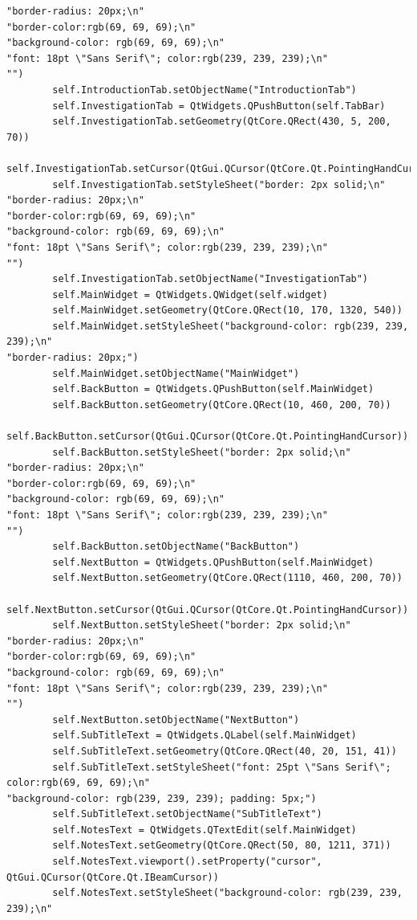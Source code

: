 \documentclass[12pt]{article}
\begin{document}
\begin{lstlisting}
"border-radius: 20px;\n"
"border-color:rgb(69, 69, 69);\n"
"background-color: rgb(69, 69, 69);\n"
"font: 18pt \"Sans Serif\"; color:rgb(239, 239, 239);\n"
"")
        self.IntroductionTab.setObjectName("IntroductionTab")
        self.InvestigationTab = QtWidgets.QPushButton(self.TabBar)
        self.InvestigationTab.setGeometry(QtCore.QRect(430, 5, 200, 70))
        self.InvestigationTab.setCursor(QtGui.QCursor(QtCore.Qt.PointingHandCursor))
        self.InvestigationTab.setStyleSheet("border: 2px solid;\n"
"border-radius: 20px;\n"
"border-color:rgb(69, 69, 69);\n"
"background-color: rgb(69, 69, 69);\n"
"font: 18pt \"Sans Serif\"; color:rgb(239, 239, 239);\n"
"")
        self.InvestigationTab.setObjectName("InvestigationTab")
        self.MainWidget = QtWidgets.QWidget(self.widget)
        self.MainWidget.setGeometry(QtCore.QRect(10, 170, 1320, 540))
        self.MainWidget.setStyleSheet("background-color: rgb(239, 239, 239);\n"
"border-radius: 20px;")
        self.MainWidget.setObjectName("MainWidget")
        self.BackButton = QtWidgets.QPushButton(self.MainWidget)
        self.BackButton.setGeometry(QtCore.QRect(10, 460, 200, 70))
        self.BackButton.setCursor(QtGui.QCursor(QtCore.Qt.PointingHandCursor))
        self.BackButton.setStyleSheet("border: 2px solid;\n"
"border-radius: 20px;\n"
"border-color:rgb(69, 69, 69);\n"
"background-color: rgb(69, 69, 69);\n"
"font: 18pt \"Sans Serif\"; color:rgb(239, 239, 239);\n"
"")
        self.BackButton.setObjectName("BackButton")
        self.NextButton = QtWidgets.QPushButton(self.MainWidget)
        self.NextButton.setGeometry(QtCore.QRect(1110, 460, 200, 70))
        self.NextButton.setCursor(QtGui.QCursor(QtCore.Qt.PointingHandCursor))
        self.NextButton.setStyleSheet("border: 2px solid;\n"
"border-radius: 20px;\n"
"border-color:rgb(69, 69, 69);\n"
"background-color: rgb(69, 69, 69);\n"
"font: 18pt \"Sans Serif\"; color:rgb(239, 239, 239);\n"
"")
        self.NextButton.setObjectName("NextButton")
        self.SubTitleText = QtWidgets.QLabel(self.MainWidget)
        self.SubTitleText.setGeometry(QtCore.QRect(40, 20, 151, 41))
        self.SubTitleText.setStyleSheet("font: 25pt \"Sans Serif\"; color:rgb(69, 69, 69);\n"
"background-color: rgb(239, 239, 239); padding: 5px;")
        self.SubTitleText.setObjectName("SubTitleText")
        self.NotesText = QtWidgets.QTextEdit(self.MainWidget)
        self.NotesText.setGeometry(QtCore.QRect(50, 80, 1211, 371))
        self.NotesText.viewport().setProperty("cursor", QtGui.QCursor(QtCore.Qt.IBeamCursor))
        self.NotesText.setStyleSheet("background-color: rgb(239, 239, 239);\n"

\end{lstlisting}
\end{document}
